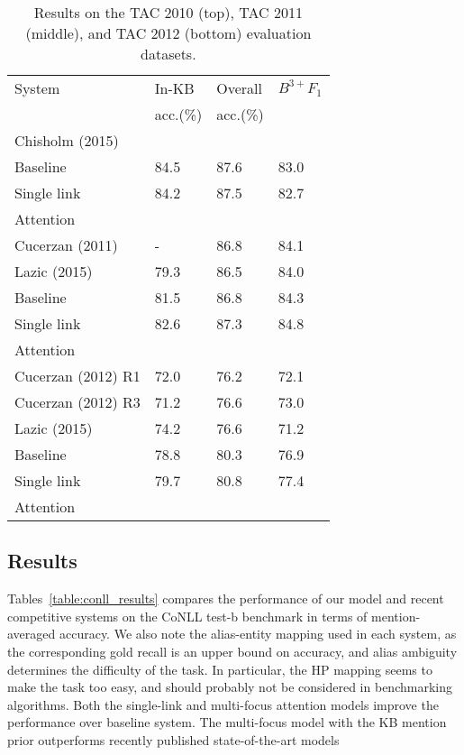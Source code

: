 \begin{table}[ht!]
\centering
\begin{tabular}{l|l|l|l}
 System & In-KB & Overall & {\small ${B^{3+}F_1}$} \\ 
 & acc.(\%) & acc.(\%) & \\
\hline
{Chisholm (2015)} & & & \\
  Baseline & 84.5 & 87.6 & 83.0 \\
 Single link & 84.2 & 87.5 & 82.7\\
 Attention & & & \\
\hline \hline
Cucerzan (2011) & - & 86.8 &  {84.1} \\
Lazic (2015) & 79.3 & 86.5 & 84.0 \\
Baseline & 81.5 & 86.8 & 84.3 \\
Single link & 82.6 & 87.3 & 84.8 \\
 Attention & & & \\
\hline
\hline
Cucerzan (2012) R1 & 72.0 & 76.2 & 72.1  \\
Cucerzan (2012) R3 & 71.2 & {76.6} & { 73.0} \\
Lazic (2015) & {74.2} & {76.6} & 71.2 \\
Baseline &78.8 & 80.3 & 76.9\\
 Single link & 79.7 & 80.8 & 77.4  \\
 Attention & & & \\
\end{tabular}
\caption{Results on the TAC 2010 (top), TAC 2011 (middle), and TAC 2012 (bottom) evaluation datasets. \label{table:tac_results} }
\end{table}

\subsection{Results}

Tables~\ref{table:conll_results} compares the performance of our model
and recent competitive systems on the CoNLL test-b benchmark
 in terms of mention-averaged accuracy. We also note the alias-entity
 mapping used in each system, as the corresponding gold recall is
 an upper bound on accuracy, and alias ambiguity determines the difficulty of the task.
 In particular, the HP mapping seems to make the task too easy, and should probably
 not be considered in benchmarking algorithms.
 Both the single-link and multi-focus attention models
 improve the performance over baseline system. The multi-focus model with the KB
 mention prior outperforms recently published state-of-the-art models


